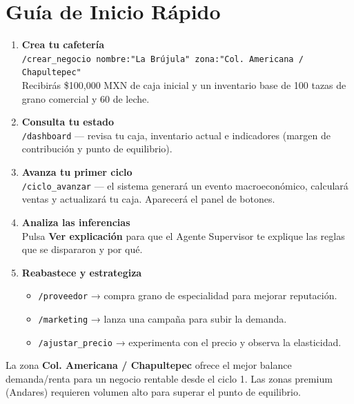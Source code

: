 \documentclass[12pt, a4paper]{article}
\begin{document}
\section{Guía de Inicio Rápido}

\begin{enumerate}[leftmargin=*, label=\textbf{\arabic*.}]
  \item \textbf{Crea tu cafetería}\\
        \texttt{/crear\_negocio nombre:"La Brújula" zona:"Col. Americana / Chapultepec"}\\
        Recibirás \$100{,}000 MXN de caja inicial y un inventario base de 100 tazas
        de grano comercial y 60 de leche.

  \item \textbf{Consulta tu estado}\\
        \texttt{/dashboard} — revisa tu caja, inventario actual e indicadores
        (margen de contribución y punto de equilibrio).

  \item \textbf{Avanza tu primer ciclo}\\
        \texttt{/ciclo\_avanzar} — el sistema generará un evento macroeconómico,
        calculará ventas y actualizará tu caja. Aparecerá el panel de botones.

  \item \textbf{Analiza las inferencias}\\
        Pulsa \textbf{Ver explicación} para que el Agente Supervisor te explique
        las reglas que se dispararon y por qué.

  \item \textbf{Reabastece y estrategiza}
  \begin{itemize}
    \item \texttt{/proveedor} → compra grano de especialidad para mejorar reputación.
    \item \texttt{/marketing} → lanza una campaña para subir la demanda.
    \item \texttt{/ajustar\_precio} → experimenta con el precio y observa la elasticidad.
  \end{itemize}
\end{enumerate}

\begin{warnbox}
La zona \textbf{Col. Americana / Chapultepec} ofrece el mejor balance
demanda/renta para un negocio rentable desde el ciclo 1. Las zonas
premium (Andares) requieren volumen alto para superar el punto de equilibrio.
\end{warnbox}
\end{document}

